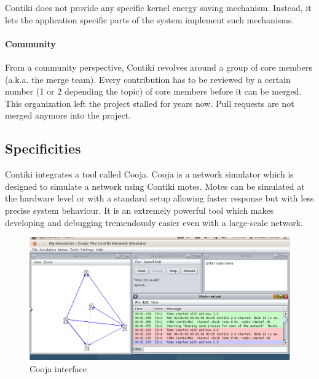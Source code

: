 Contiki does not provide any specific kernel energy saving mechanism.
Instead, it lets the application specific parts of the system implement such mechanisms.

\paragraph{Community} From a community perspective, Contiki revolves around a group of core members (a.k.a. the merge team)\cite{contikipr}.
Every contribution has to be reviewed by a certain number (1 or 2 depending the topic) of core members before it can be merged.
This organization left the project stalled for years now.
Pull requests are not merged anymore into the project.

\subsection{Specificities}
Contiki integrates a tool called Cooja.
Cooja is a network simulator which is designed to simulate a network using Contiki motes.
Motes can be simulated at the hardware level or with a standard setup allowing faster response but with less precise system behaviour.
It is an extremely powerful tool which makes developing and debugging tremendously easier even with a large-scale network.

\begin{figure}[!h]
    \centering
    \includegraphics[scale=0.4]{assets/cooja.png}
    \caption{\label{fig:cooja}Cooja interface}
\end{figure}

